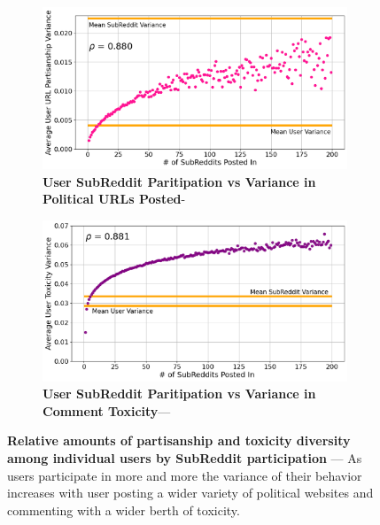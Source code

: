 \begin{figure}
\begin{subfigure}{.48\textwidth}
  \centering
  \includegraphics[width=1\linewidth]{figures/numberOfSubRedditsByPartianshipAvg.png}
  \caption{\textbf{User SubReddit Paritipation vs Variance in Political URLs Posted}-
}
\label{fig:participation-political}
\end{subfigure}%
\begin{subfigure}{.48\textwidth}
  \centering
  \includegraphics[width=1\linewidth]{figures/numberOfSubRedditsByToxicityAvg.png}
 \caption{\textbf{User SubReddit Paritipation vs Variance in Comment Toxicity}— 
}
 \label{fig:participation-toxicity}
\end{subfigure}
\caption{\textbf{Relative amounts of partisanship and toxicity diversity among individual users by SubReddit participation }--- As users participate in more and more the variance of their behavior increases with user posting a wider variety of political websites and commenting with a wider berth of toxicity. 
}
\label{fig:participation}
\end{figure}
